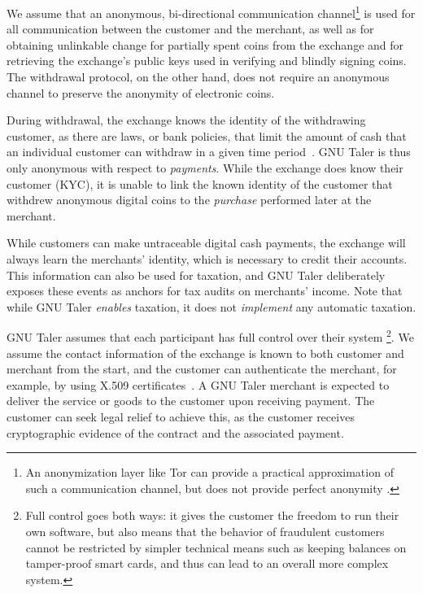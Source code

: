 We assume that an anonymous, bi-directional communication channel\footnote{%
An anonymization layer like Tor \cite{dingledine2004tor} can provide a
practical approximation of such a communication channel, but does not provide
perfect anonymity \cite{johnson2013users}.
} is used for
all communication between the customer and the merchant, as well as for
obtaining unlinkable change for partially spent coins from the exchange and for
retrieving the exchange's public keys used in verifying and blindly signing
coins.  The withdrawal protocol, on the other hand, does not require an
anonymous channel to preserve the anonymity of electronic coins.

During withdrawal, the exchange knows the identity of the withdrawing customer,
as there are laws, or bank policies, that limit the amount of cash that an
individual customer can withdraw in a given time
period~\cite{france2015cash,greece2015cash}.  GNU Taler is thus only anonymous with
respect to \emph{payments}.  While the exchange does know their customer (KYC),
it is unable to link the known identity of the customer that withdrew anonymous
digital coins to the \emph{purchase} performed later at the merchant.

While customers can make untraceable digital cash payments, the exchange will
always learn the merchants' identity, which is necessary to credit their
accounts.  This information can also be used for taxation, and GNU Taler
deliberately exposes these events as anchors for tax audits on merchants'
income.  Note that while GNU Taler \emph{enables} taxation, it does not
\emph{implement} any automatic taxation.

GNU Taler assumes that each participant has full control over their
system%
\footnote{%
  Full control goes both ways:  it gives the customer the freedom to run their own software,
  but also means that the behavior of fraudulent customers cannot be restricted by
  simpler technical means such as keeping balances on tamper-proof smart cards,
  and thus can lead to an overall more complex system.
}.  We assume the contact information of the exchange is known to
both customer and merchant from the start, and the customer
can authenticate the merchant, for example, by using X.509
certificates~\cite{rfc6818}.  A GNU Taler merchant is expected to deliver
the service or goods to the customer upon receiving payment.  The
customer can seek legal relief to achieve this, as the customer
receives cryptographic evidence of the contract and the associated
payment.

